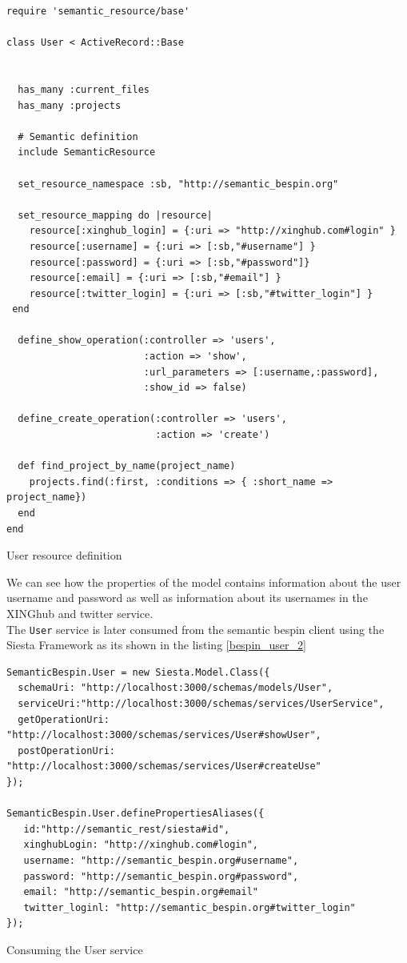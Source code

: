 \begin{table}
\vspace{5 mm}
\begin{lstlisting}
require 'semantic_resource/base'

class User < ActiveRecord::Base
  

  has_many :current_files
  has_many :projects

  # Semantic definition
  include SemanticResource

  set_resource_namespace :sb, "http://semantic_bespin.org"

  set_resource_mapping do |resource|
    resource[:xinghub_login] = {:uri => "http://xinghub.com#login" }
    resource[:username] = {:uri => [:sb,"#username"] }
    resource[:password] = {:uri => [:sb,"#password"]}
    resource[:email] = {:uri => [:sb,"#email"] }
    resource[:twitter_login] = {:uri => [:sb,"#twitter_login"] }
 end

  define_show_operation(:controller => 'users',
                        :action => 'show',
                        :url_parameters => [:username,:password],
                        :show_id => false)

  define_create_operation(:controller => 'users',
                          :action => 'create')

  def find_project_by_name(project_name)
    projects.find(:first, :conditions => { :short_name => project_name})
  end
end
\end{lstlisting} 
\vspace{5 mm}
\caption{User resource definition}
\label{bespin_user_1}
\end{table}

We can see how the properties of the model contains information about the user username and password as well as
information about its usernames in the XINGhub and twitter service.\\

The \texttt{User} service is later consumed from the semantic bespin client using the Siesta Framework as its shown in
the listing \ref{bespin_user_2}

\begin{table}
\vspace{5 mm}
\begin{lstlisting}
SemanticBespin.User = new Siesta.Model.Class({
  schemaUri: "http://localhost:3000/schemas/models/User",
  serviceUri:"http://localhost:3000/schemas/services/UserService",
  getOperationUri: "http://localhost:3000/schemas/services/User#showUser",
  postOperationUri: "http://localhost:3000/schemas/services/User#createUse"
});

SemanticBespin.User.definePropertiesAliases({
   id:"http://semantic_rest/siesta#id",
   xinghubLogin: "http://xinghub.com#login",
   username: "http://semantic_bespin.org#username",
   password: "http://semantic_bespin.org#password",
   email: "http://semantic_bespin.org#email"
   twitter_loginl: "http://semantic_bespin.org#twitter_login"
});
\end{lstlisting} 
\vspace{5 mm}
\caption{Consuming the User service}
\label{bespin_user_2}
\end{table}

